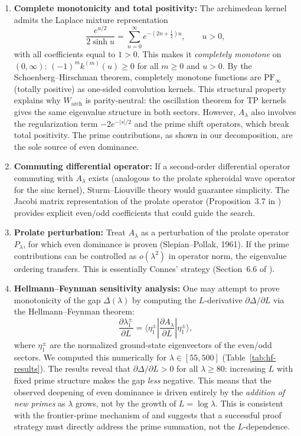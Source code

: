 \documentclass[12pt,a4paper]{article}
\theoremstyle{definition}
\theoremstyle{remark}
\begin{document}
\begin{enumerate}[label=(\Alph*)]
  \item \textbf{Complete monotonicity and total positivity:} The archimedean kernel admits the Laplace mixture representation
  \[ \frac{e^{u/2}}{2\sinh u} = \sum_{n=0}^\infty e^{-(2n+\frac{1}{2})u}, \qquad u > 0, \]
  with all coefficients equal to $1 > 0$. This makes it \emph{completely monotone} on $(0,\infty)$: $(-1)^m k^{(m)}(u) \geq 0$ for all $m \geq 0$ and $u > 0$. By the Schoenberg--Hirschman theorem, completely monotone functions are $\mathrm{PF}_\infty$ (totally positive) as one-sided convolution kernels. This structural property explains why $W_{\mathrm{arch}}$ is parity-neutral: the oscillation theorem for TP kernels gives the same eigenvalue structure in both sectors. However, $A_\lambda$ also involves the regularization term $-2e^{-|s|/2}$ and the prime shift operators, which break total positivity. The prime contributions, as shown in our decomposition, are the sole source of even dominance.

  \item \textbf{Commuting differential operator:} If a second-order differential operator commuting with $A_\lambda$ exists (analogous to the prolate spheroidal wave operator for the sinc kernel), Sturm--Liouville theory would guarantee simplicity. The Jacobi matrix representation of the prolate operator (Proposition~3.7 in \cite{ConnesMoscovici2023}) provides explicit even/odd coefficients that could guide the search.

  \item \textbf{Prolate perturbation:} Treat $A_\lambda$ as a perturbation of the prolate operator $P_\lambda$, for which even dominance is proven (Slepian--Pollak, 1961). If the prime contributions can be controlled as $o(\lambda^2)$ in operator norm, the eigenvalue ordering transfers. This is essentially Connes' strategy (Section~6.6 of \cite{Connes2025}).

  \item \textbf{Hellmann--Feynman sensitivity analysis:} One may attempt to prove monotonicity of the gap $\Delta(\lambda)$ by computing the $L$-derivative $\partial\Delta/\partial L$ via the Hellmann--Feynman theorem:
  \[ \frac{\partial \lambda_1^\pm}{\partial L} = \langle \eta_1^\pm | \frac{\partial A_\lambda}{\partial L} | \eta_1^\pm \rangle, \]
  where $\eta_1^\pm$ are the normalized ground-state eigenvectors of the even/odd sectors.
  We computed this numerically for $\lambda \in [55, 500]$ (Table~\ref{tab:hf-results}). The results reveal that $\partial\Delta/\partial L > 0$ for all $\lambda \geq 80$: increasing $L$ with fixed prime structure makes the gap \emph{less} negative. This means that the observed deepening of even dominance is driven entirely by the \emph{addition of new primes} as $\lambda$ grows, not by the growth of $L = \log\lambda$. This is consistent with the frontier-prime mechanism of  and suggests that a successful proof strategy must directly address the prime summation, not the $L$-dependence.
\end{enumerate}
\end{document}
